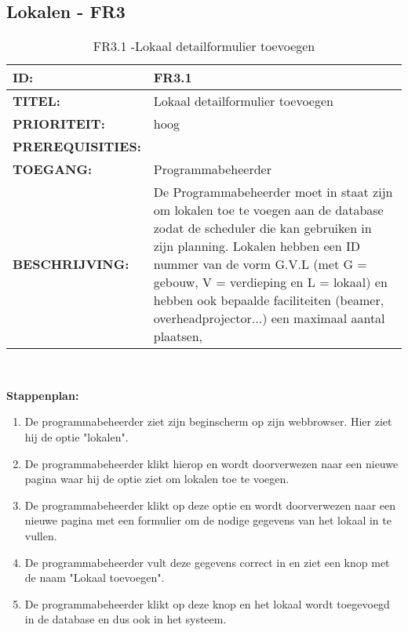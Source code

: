 \subsection{Lokalen - FR3}

\noindent\begin{table}[H]
            \begin{tabular}{l | p{10cm}}
                \textbf{ID:} & FR3.1 \\ \hline
                \textbf{TITEL:} & Lokaal detailformulier toevoegen\\ \hline
                \textbf{PRIORITEIT:} &  hoog \\ \hline
                \textbf{PREREQUISITIES:} & \\ \hline
                \textbf{TOEGANG:} & Programmabeheerder \\ \hline
                \textbf{BESCHRIJVING:} & De Programmabeheerder moet in staat zijn om lokalen toe te voegen aan de database zodat de scheduler die kan gebruiken in zijn planning. Lokalen hebben een ID nummer van de vorm G.V.L (met G = gebouw, V = verdieping en L = lokaal) en hebben ook bepaalde faciliteiten (beamer, overheadprojector...) een maximaal aantal plaatsen, \\ 
            \end{tabular}\\
            \caption{FR3.1 -Lokaal detailformulier toevoegen}
            \label{tab:FR3.1 - Lokaal detailformulier toevoegen}
        \end{table}

\textbf{Stappenplan:}
\begin{enumerate}
\item De programmabeheerder ziet zijn beginscherm op zijn webbrowser. Hier ziet hij de optie "lokalen".
\item De programmabeheerder klikt hierop en wordt doorverwezen naar een nieuwe pagina waar hij de optie ziet om lokalen toe te voegen.
\item De programmabeheerder klikt op deze optie en wordt doorverwezen naar een nieuwe pagina met een formulier om de nodige gegevens van het lokaal in te vullen.
\item De programmabeheerder vult deze gegevens correct in en ziet een knop met de naam "Lokaal toevoegen".
\item De programmabeheerder klikt op deze knop en het lokaal wordt toegevoegd in de database en dus ook in het systeem.
\end{enumerate}

